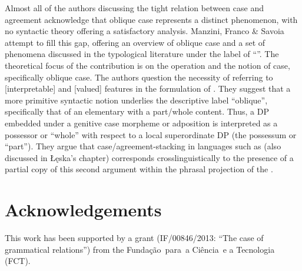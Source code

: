 \documentclass[output=paper]{langsci/langscibook}
\begin{document}
Almost all of the authors discussing the tight relation between case and agreement acknowledge that oblique case represents a distinct phenomenon, with no syntactic theory offering a satisfactory analysis. Manzini, Franco \& Savoia attempt to fill this gap, offering an overview of oblique case and a set of phenomena discussed in the typological literature under the label of ``''. The theoretical focus of the contribution is on the  operation  and the notion of case, specifically oblique case. The authors question the necessity of referring to [interpretable] and [valued] features in the formulation of . They suggest that a more primitive syntactic notion underlies the descriptive label ``oblique'', specifically that of an elementary  with a part\slash whole content. Thus, a DP embedded under a genitive case morpheme or adposition is interpreted as a possessor or ``whole'' with respect to a local superordinate DP (the possessum or ``part''). They argue that case\slash agreement-stacking in languages such as  (also discussed in Łęska’s chapter) corresponds crosslinguistically to the presence of a partial copy of this second argument within the phrasal projection of the .

\section*{Acknowledgements}
This work has been supported by a grant (IF/00846/2013: ``The case of grammatical relations'') from the  Fundação~para~a Ciência~e a Tecnologia (FCT).

{\sloppy\printbibliography[heading=subbibliography,notkeyword=this] }
\end{document}
